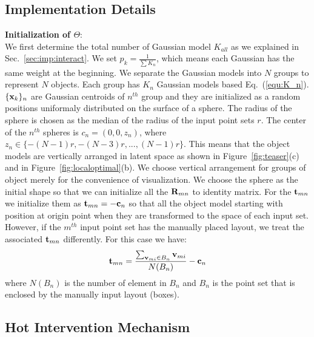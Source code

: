 \subsection{Implementation Details}
\textbf{Initialization of $\Theta$}:\\
We first determine the total number of Gaussian model $K_{all}$ as we explained in Sec.~\ref{sec:imp:interact}. 
We set $p_k=\frac{1}{\sum K_n}$, which means each Gaussian has the same weight at the beginning. 
We separate the Gaussian models into $N$ groups to represent $N$ objects. 
Each group has $K_n$ Gaussian models based Eq.~(\ref{equ:K_n}). $\{\mathbf{x}_k\}_n$ are Gaussian centroids of $n^{th}$ group and they are initialized as a random positions uniformaly distributed on the surface of a sphere. 
The radius of the sphere is chosen as the median of the radius of the input point sets $r$. The center of the $n^{th}$ spheres is $c_n=(0,0,z_n)$, where $z_n\in \{-(N-1)r,-(N-3)r,...,(N-1)r\}$. This means that the object models are vertically arranged in latent space as shown in Figure~\ref{fig:teaser}(c) and in Figure~\ref{fig:localoptimal}(b). 
We choose vertical arrangement for groups of object merely for the convenience of visualization. We choose the sphere as the initial shape so that we can initialize all the $\mathbf{R}_{mn}$ to identity matrix. For the $\mathbf{t}_{mn}$ we initialize them as $\mathbf{t}_{mn}=- \mathbf{c}_n$ so that all the object model starting with position at origin point when they are transformed to the space of each input set. However, if the $m^{th}$ input point set has the manually placed layout, we treat the associated $\mathbf{t}_{mn}$ differently. For this case we have:
\begin{equation}
\label{equ:initt}
\mathbf{t}_{mn}=\frac{\sum_{\mathbf{v}_{mi} \in B_n}\mathbf{v}_{mi}}{N(B_n)}-\mathbf{c}_n
\end{equation}
where $N(B_n)$ is the number of element in $B_n$ and $B_n$ is the point set that is enclosed by the manually input layout (boxes). 



\subsection{Hot Intervention Mechanism}
%

